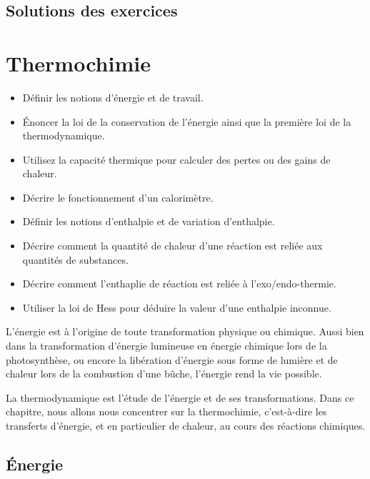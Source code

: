 \documentclass[
  11pt,
  a4paper,
  openany]{book}
\providecommand{\tightlist}{%
  \setlength{\itemsep}{0pt}\setlength{\parskip}{0pt}}
\begin{document}
\clearpage

\section{Solutions des exercices} \shipoutAnswer

\chapter{Thermochimie}\label{thermochimie}

\begin{objectives}

\begin{itemize}
\tightlist
\item
  Définir les notions d'énergie et de travail.
\item
  Énoncer la loi de la conservation de l'énergie ainsi que la première loi de la thermodynamique.
\item
  Utilisez la capacité thermique pour calculer des pertes ou des gains de chaleur.
\item
  Décrire le fonctionnement d'un calorimètre.
\item
  Définir les notions d'enthalpie et de variation d'enthalpie.
\item
  Décrire comment la quantité de chaleur d'une réaction est reliée aux quantités de substances.
\item
  Décrire comment l'enthaplie de réaction est reliée à l'exo/endo-thermie.
\item
  Utiliser la loi de Hess pour déduire la valeur d'une enthalpie inconnue.
\end{itemize}

\end{objectives}

L'énergie est à l'origine de toute transformation physique ou chimique. Aussi bien dans la transformation d'énergie lumineuse en énergie chimique lors de la photosynthèse, ou encore la libération d'énergie sous forme de lumière et de chaleur lors de la combustion d'une bûche, l'énergie rend la vie possible.

La thermodynamique est l'étude de l'énergie et de ses transformations. Dans ce chapitre, nous allons nous concentrer sur la thermochimie, c'est-à-dire les transferts d'énergie, et en particulier de chaleur, au cours des réactions chimiques.

\section{Énergie}\label{uxe9nergie}
\end{document}
